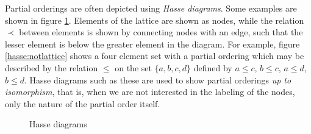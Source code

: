 \documentclass[12pt]{report}
\begin{document}
Partial orderings are often depicted using \emph{Hasse diagrams}. Some examples are shown in figure \ref{hasse}. Elements of the lattice are shown as nodes, while the relation $\prec$ between elements is shown by connecting nodes with an edge, such that the lesser element is below the greater element in the diagram. For example, figure \ref{hasse:notlattice} shows a four element set with a partial ordering which may be described by the relation $\le$ on the set $\{a,b,c,d\}$ defined by $a \le c$, $b \le c$, $a \le d$, $b\le d$. Hasse diagrams such as these are used to show partial orderings \emph{up to isomorphism}, that is, when we are not interested in the labeling of the nodes, only the nature of the partial order itself. 
\begin{figure}
\begin{center}

%
\hfill
{}
\hfill
{}
\hfill
\caption{Hasse diagrams}
\label{hasse}
\end{center}
\end{figure}
\end{document}
